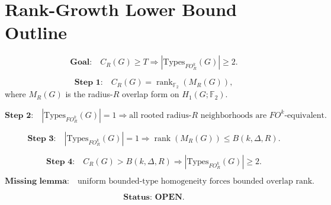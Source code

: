 \documentclass{article}
\begin{document}
\section*{Rank-Growth Lower Bound Outline}

\[
\textbf{Goal:}\quad C_R(G)\ge T \Rightarrow |\mathrm{Types}_{FO^k_R}(G)|\ge 2.
\]

\[
\textbf{Step 1:}\quad
C_R(G)=\operatorname{rank}_{\mathbb F_2}(M_R(G)),
\]
where \(M_R(G)\) is the radius-\(R\) overlap form on \(H_1(G;\mathbb F_2)\).

\[
\textbf{Step 2:}\quad
|\mathrm{Types}_{FO^k_R}(G)|=1
\Rightarrow
\text{all rooted radius-}R\text{ neighborhoods are }FO^k\text{-equivalent.}
\]

\[
\textbf{Step 3:}\quad
|\mathrm{Types}_{FO^k_R}(G)|=1
\Rightarrow
\operatorname{rank}(M_R(G))\le B(k,\Delta,R).
\]

\[
\textbf{Step 4:}\quad
C_R(G)>B(k,\Delta,R)
\Rightarrow
|\mathrm{Types}_{FO^k_R}(G)|\ge 2.
\]

\[
\textbf{Missing lemma:}\quad
\text{uniform bounded-type homogeneity forces bounded overlap rank.}
\]

\[
\textbf{Status: OPEN.}
\]
\end{document}
